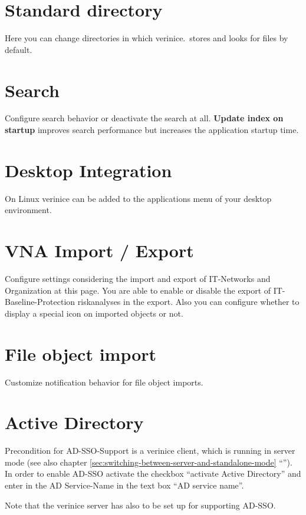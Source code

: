 \documentclass[a4paper,10pt]{book}
\begin{document}
\section{Standard directory}\label{sec:default_dir}
Here you can change directories in which verinice.\ stores and looks for files
by default.

\section{Search}\label{sec:search}
Configure search behavior or deactivate the search at all.
\textbf{Update index on startup} improves search performance but increases
the application startup time.

\section{Desktop Integration}\label{sec:desktop-integration}
On Linux verinice can be added to the applications menu of your desktop environment.

\section{VNA Import / Export}
Configure settings considering the import and export of IT-Networks and Organization at this page. You are able to enable or disable the export of IT-Baseline-Protection riskanalyses
in the export. Also you can configure whether to display a special icon on imported objects or not.

\section{File object import}\label{sec:file-object-import}
Customize notification behavior for file object imports.

\section{Active Directory}
\label{active-directory}

Precondition for AD-SSO-Support is a verinice client, which is running
in server mode (see also chapter
\ref{sec:switching-between-server-and-standalone-mode}
``''). In order
to enable AD-SSO activate the checkbox ``activate Active Directory''
and enter in the AD Service-Name in the text box ``AD service name''.

Note that the verinice server has also to be set up for supporting
AD-SSO.
\end{document}
